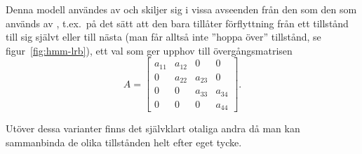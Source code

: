 \documentclass[../rapport_MVEX01-11-05]{subfiles}
\begin{document}
Denna modell användes av
 och skiljer sig i vissa avseenden från
den som den som används av , t.ex.~på det sätt att
den bara tillåter förflyttning från
ett tillstånd till sig självt eller till nästa (man får alltså inte ''hoppa
över'' tillstånd, se figur~\vref{fig:hmm-lrb}), ett val som ger upphov
till övergångsmatrisen
\begin{equation*}
A = \begin{bmatrix}
a_{11} & a_{12} & 0 & 0\\
0 & a_{22} & a_{23} & 0\\
0 & 0 & a_{33} & a_{34}\\
0 & 0 & 0 & a_{44}
\end{bmatrix}.  
\end{equation*} 

Utöver dessa varianter finns det självklart otaliga andra då man kan
sammanbinda de olika tillstånden helt efter eget tycke.
\end{document}
